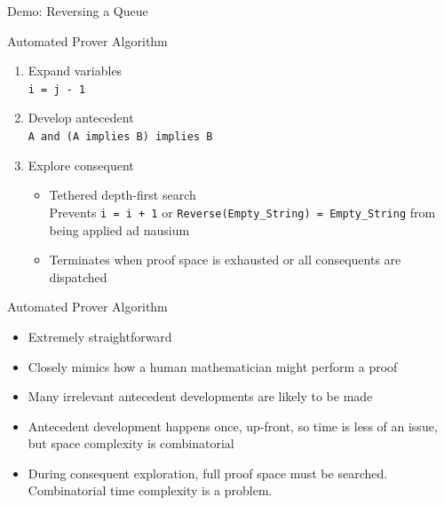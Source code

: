 \begin{frame}{Demo: Reversing a Queue}
~
\end{frame}


\begin{frame}{Automated Prover Algorithm}
	\begin{enumerate}
		\item Expand variables\\
			\texttt{i = j - 1}
		\item Develop antecedent\\
			\texttt{A and (A implies B) implies B}
		\item Explore consequent\\
		\begin{itemize}
			\item Tethered depth-first search\\
				Prevents \texttt{i = i + 1} or \texttt{Reverse(Empty\_String) = Empty\_String} from being applied ad nausium
			\item Terminates when proof space is exhausted or all consequents are dispatched
		\end{itemize}
	\end{enumerate}
\end{frame}


\begin{frame}{Automated Prover Algorithm}
	\begin{itemize}
		\item Extremely straightforward
		\item Closely mimics how a human mathematician might perform a proof
		\item Many irrelevant antecedent developments are likely to be made
		\item Antecedent development happens once, up-front, so time is less of an issue, but space complexity is combinatorial
		\item During consequent exploration, full proof space must be searched.  Combinatorial time complexity is a problem.
	\end{itemize}
\end{frame}


